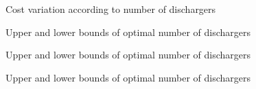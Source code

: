 \documentclass{article}
\begin{document}
\begin{figure}
\begin{center}

\caption{Cost variation according to number of dischargers}
\end{center}
\end{figure}

\begin{figure}
\begin{center}

\caption{Upper and lower bounds of optimal number of dischargers}
\end{center}
\end{figure}

\begin{figure}
\begin{center}

\caption{Upper and lower bounds of optimal number of dischargers}
\end{center}
\end{figure}

\begin{figure}
\begin{center}

\caption{Upper and lower bounds of optimal number of dischargers}
\end{center}
\end{figure}
\end{document}
